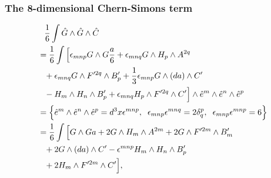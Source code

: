 \subsubsection{The 8-dimensional Chern-Simons term}
\begin{align}
&\phantom{=}{1 \over 6} \int \hat{G} \wedge \hat{G} \wedge \hat{C} \nonumber \\
&={1 \over 6} \int \Big{[} {\epsilon}_{mnp} G \wedge G {a \over 6} +{\epsilon}_{mnq} G \wedge H_p \wedge A^{2q} \nonumber \\
&\phantom{=}+ {\epsilon}_{mnq} G \wedge F'^{2q} \wedge B'_p + {1 \over 3} {\epsilon}_{mnp} G \wedge (da) \wedge C' \nonumber \\
&\phantom{=}- H_m \wedge H_n \wedge B'_p +  {\epsilon}_{mnq} H_p \wedge F'^{2q} \wedge C' \Big{]} \wedge \hat{e}^m \wedge \hat{e}^n \wedge \hat{e}^p \nonumber \\
&=\Big{\{} \hat{e}^m \wedge \hat{e}^n \wedge \hat{e}^p = d^3 x {\epsilon}^{mnp},\hspace{0.2cm} {\epsilon}_{mnp} {\epsilon}^{mnq} = 2\delta^{p}_q ,\hspace{0.2cm} {\epsilon}_{mnp}{\epsilon}^{mnp} = 6 \Big{\}} \nonumber \\
&={1 \over 6} \int \Big{[} G \wedge G a + 2G \wedge H_m \wedge A^{2m} + 2G \wedge F'^{2m} \wedge B'_m \nonumber \\
&\phantom{=}+ 2G \wedge (da) \wedge C' - {\epsilon}^{mnp}H_m \wedge H_n \wedge B'_p \nonumber \\
&\phantom{=}+2H_m \wedge F'^{2m} \wedge C' \Big{]},
\label{kjd}
\end{align}

